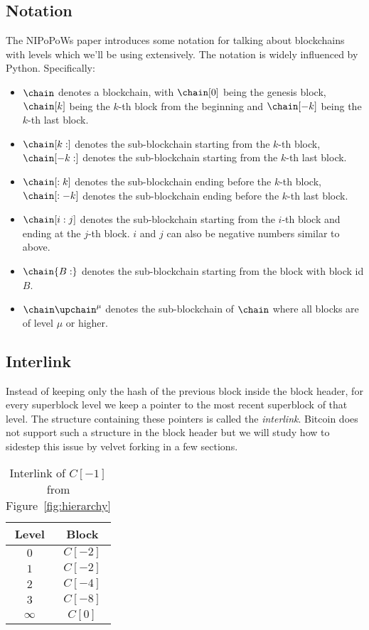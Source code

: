 \subsection{Notation}
The NIPoPoWs paper introduces some notation for talking about blockchains with levels which we'll be using extensively. The notation is widely influenced by Python. Specifically:

\begin{itemize}
  \item $\chain$ denotes a blockchain, with $\chain[0]$ being the genesis block, $\chain[k]$ being the $k$-th block from the beginning and $\chain[-k]$ being the $k$-th last block.
  \item $\chain[k:]$ denotes the sub-blockchain starting from the $k$-th block, $\chain[-k:]$ denotes the sub-blockchain starting from the $k$-th last block.
  \item $\chain[:k]$ denotes the sub-blockchain ending before the $k$-th block, $\chain[:-k]$ denotes the sub-blockchain ending before the $k$-th last block.
  \item $\chain[i:j]$ denotes the sub-blockchain starting from the $i$-th block and ending at the $j$-th block. $i$ and $j$ can also be negative numbers similar to above.
  \item $\chain\{B:\}$ denotes the sub-blockchain starting from the block with block id $B$. 
  \item $\chain\upchain^\mu$ denotes the sub-blockchain of $\chain$ where all blocks are of level $\mu$ or higher. 
\end{itemize}

\subsection{Interlink}
Instead of keeping only the hash of the previous block inside the block header, for every superblock level we keep a pointer to the most recent superblock of that level. The structure containing these pointers is called the \emph{interlink}. Bitcoin does not support such a structure in the block header but we will study how to sidestep this issue by velvet forking in a few sections.

\begin{table}
  \centering
  \begin{tabular}{|c|c|}
    \hline
    Level & Block \\
    \hline
    $0$ & $C[-2]$ \\
    $1$ & $C[-2]$ \\
    $2$ & $C[-4]$ \\
    $3$ & $C[-8]$ \\
    $\infty$ & $C[0]$ \\
    \hline
  \end{tabular}
  \caption{Interlink of $C[-1]$ from Figure~\ref{fig:hierarchy}}
  \label{table:interlink-example}
\end{table}

